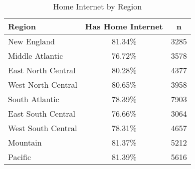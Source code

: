 \documentclass{article}
\begin{document}
\begin{table}[ht]
\centering
\begin{tabular}{lcc}
  \hline
  Region & Has Home Internet & n \\ 
  \hline
  New England & 81.34\% & 3285 \\ 
  Middle Atlantic & 76.72\% & 3578 \\ 
  East North Central & 80.28\% & 4377 \\ 
  West North Central & 80.65\% & 3958 \\ 
  South Atlantic & 78.39\% & 7903 \\ 
  East South Central & 76.66\% & 3064 \\ 
  West South Central & 78.31\% & 4657 \\ 
  Mountain & 81.37\% & 5212 \\ 
  Pacific & 81.39\% & 5616 \\ 
   \hline
\end{tabular}
\caption*{Home Internet by Region} 
\end{table}
\end{document}
